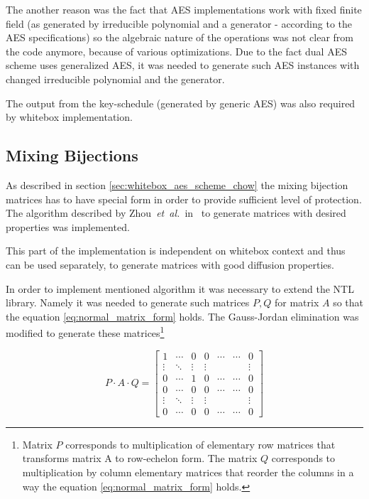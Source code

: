 \documentclass[11pt,oneside,final]{fithesis2}
\newcommand{\eal}{\emph{et~al.}}
\begin{document}
    The another reason was the fact that AES implementations work with fixed finite field (as generated by irreducible polynomial and a generator - according 
    to the AES specifications) so the algebraic nature of the operations was not clear from the code anymore, because of various optimizations. Due to the fact
    dual AES scheme uses generalized AES, it was needed to generate such AES instances with changed irreducible polynomial and the generator. 
    
    The output from the key-schedule (generated by generic AES) was also required by whitebox implementation.
    
    \subsection{Mixing Bijections}\label{sec:mixingBijectionsImpl}
    As described in section \ref{sec:whitebox_aes_scheme_chow} the mixing bijection matrices has to have special form in order to provide sufficient 
    level of protection. The algorithm described by Zhou~\eal\ in~\citep{journals/iacr/XiaoZ02} to generate matrices with desired properties was implemented.
    
    This part of the implementation is independent on whitebox context and thus can be used separately, to generate matrices with good diffusion properties.
    
    In order to implement mentioned algorithm it was necessary to extend the NTL library. Namely it was needed to generate such matrices $P, Q$ for matrix $A$
    so that the equation \ref{eq:normal_matrix_form} holds. The Gauss-Jordan elimination was modified to generate these matrices\footnote{Matrix $P$ corresponds to multiplication of 
    elementary row matrices that transforms matrix A to row-echelon form. The matrix $Q$ corresponds to multiplication by column elementary matrices that
    reorder the columns in a way the equation \ref{eq:normal_matrix_form} holds.}

    \begin{equation}\label{eq:normal_matrix_form}
	P \cdot A \cdot Q = 
	\begin{bmatrix}
	    1      & \cdots & 0      & 0      & \cdots & \cdots & 0      \\
	    \vdots & \ddots & \vdots & \vdots &        &        & \vdots \\ 
	    0      & \cdots & 1      & 0      & \cdots & \cdots & 0      \\
	    0      & \cdots & 0      & 0      & \cdots & \cdots & 0      \\
	    \vdots & \ddots & \vdots & \vdots &        &        & \vdots \\ 
	    0      & \cdots & 0      & 0      & \cdots & \cdots & 0      
	\end{bmatrix}
    \end{equation}
    
\end{document}
